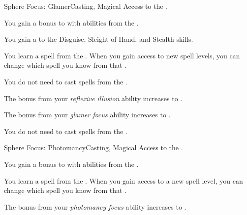     \begin{feat}{Sphere Focus: Glamer}{Casting, Magical}
        \featpre Access to the  .

         You gain a  bonus to  with abilities from the  .

         You gain a   to the Disguise, Sleight of Hand, and Stealth skills.

         You learn a spell from the  .
        When you gain access to new spell levels, you can change which spell you know from that .

         You do not need  to cast spells from the  .

         The bonus from your \textit{reflexive illusion} ability increases to .

         The bonus from your \textit{glamer focus} ability increases to .

         You do not need  to cast spells from the  .
    \end{feat}

    \begin{feat}{Sphere Focus: Photomancy}{Casting, Magical}
        \featpre Access to the  .

         You gain a  bonus to  with abilities from the  .

         You learn a spell from the  .
        When you gain access to a new spell level, you can change which spell you know from that .

         The bonus from your \textit{photomancy focus} ability increases to .
    \end{feat}

